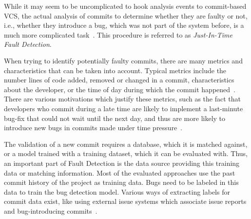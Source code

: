 While it may seem to be uncomplicated to hook analysis events to commit-based VCS, the actual analysis of commits to determine whether they are faulty or not, i.e., whether they introduce a bug, which was not part of the system before, is a much more complicated task~\cite{Nayrolles2018, Kamei2013}. This procedure is referred to as \textit{Just-In-Time Fault Detection}.

When trying to identify potentially faulty commits, there are many metrics and characteristics that can be taken into account. Typical metrics include the number lines of code added, removed or changed in a commit, characteristics about the developer, or the time of day during which the commit happened~\cite{Goyal2017}. There are various motivations which justify these metrics, such as the fact that developers who commit during a late time are likely to implement a last-minute bug-fix that could not wait until the next day, and thus are more likely to introduce new bugs in commits made under time pressure~\cite{Goyal2017}.


The validation of a new commit requires a database, which it is matched against, or a model trained with a training dataset, which it can be evaluated with.
Thus, an important part of Fault Detection is the data source providing this training data or matching information. 
Most of the evaluated approaches use the past commit history of the project as training data.
Bugs need to be labeled in this data to train the bug detection model.
Various ways of extracting labels for commit data exist, like using external issue systems which associate issue reports and bug-introducing commits~\cite{Nayrolles2018,Rosen2015}.

